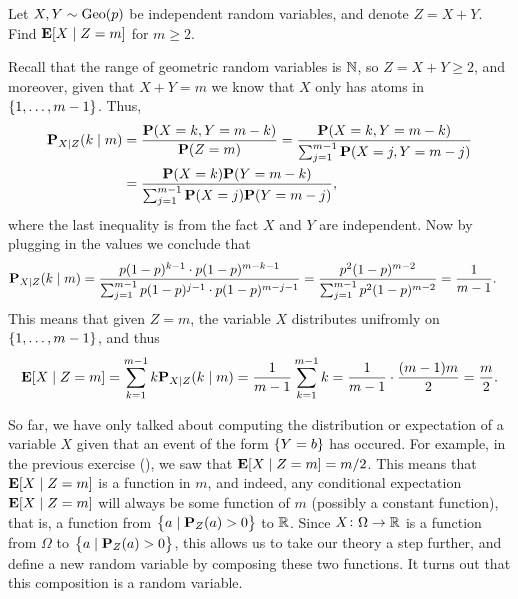 \documentclass[11pt,a4paper]{article}
\begin{document}
\begin{exercise}
  \label{ex:conditional-expectation}
  Let $X,Y \sim \operatorname{Geo}(p)$ be independent random variables,
  and denote $Z = X + Y$.
  Find $\mathbf{E}[X \mid Z = m]$ for $m \geq 2$.
\end{exercise}
\begin{solution}
  Recall that the range of geometric random variables is $\mathbb{N}$,
  so $Z = X + Y \geq 2$,
  and moreover, given that $X + Y = m$ we know that
  $X$ only has atoms in $\left\{1,\dots,m-1\right\}$.
  Thus,
  \begin{align*}
    \mathbf{P}_{X \mid Z}(k \mid m) &=
    \frac{\mathbf{P}(X = k, Y = m - k)}{\mathbf{P}(Z = m)} =
    \frac{\mathbf{P}(X = k, Y = m - k)}{\sum_{j=1}^{m-1} \mathbf{P}(X = j, Y = m - j)}
                            \\ &=
    \frac{\mathbf{P}(X = k)\mathbf{P}(Y = m - k)}{\sum_{j=1}^{m-1}
      \mathbf{P}(X = j)\mathbf{P}(Y = m - j)},
  \end{align*}
  where the last inequality is from the fact $X$ and $Y$ are independent.
  Now by plugging in the values we conclude that
  \begin{align*}
    \mathbf{P}_{X \mid Z}(k \mid m) &=
    \frac{p(1 - p)^{k-1} \cdot p(1 - p)^{m-k-1}}{\sum_{j=1}^{m-1}
      p(1 - p)^{j-1} \cdot p(1 - p)^{m-j-1}} =
    \frac{p^2(1 - p)^{m-2}}{\sum_{j=1}^{m-1} p^2(1 - p)^{m-2}} =
    \frac{1}{m - 1}.
  \end{align*}
  This means that given $Z = m$,
  the variable $X$ distributes unifromly on $\left\{1,\dots,m-1\right\}$,
  and thus
  \[
    \mathbf{E}[X \mid Z = m] =
    \sum_{k=1}^{m-1} k \mathbf{P}_{X \mid Z}(k \mid m) =
    \frac{1}{m - 1} \sum_{k=1}^{m-1} k =
    \frac{1}{m - 1} \cdot \frac{(m - 1) m}{2} =
    \frac{m}{2}.
  \]
\end{solution}

\begin{remark}
  So far, we have only talked about computing the distribution or expectation
  of a variable $X$ given that an event of the form $\left\{Y = b\right\}$ has occured.
  For example, in the previous exercise (),
  we saw that $\mathbf{E}[X \mid Z = m] = m/2$.
  This means that $\mathbf{E}[X \mid Z = m]$ is a function in $m$,
  and indeed, any conditional expectation $\mathbf{E}[X \mid Z = m]$ will always
  be some function of $m$ (possibly a constant function),
  that is, a function from $\left\{a \mid \mathbf{P}_Z(a) > 0\right\}$ to $\mathbb{R}$.
  Since $X \colon \Omega \to \mathbb{R}$ is a function from
  $\Omega$ to $\left\{a \mid \mathbf{P}_Z(a) > 0\right\}$,
  this allows us to take our theory a step further,
  and define a new random variable by composing these two functions.
  It turns out that this composition is a random variable.
\end{remark}
\end{document}
